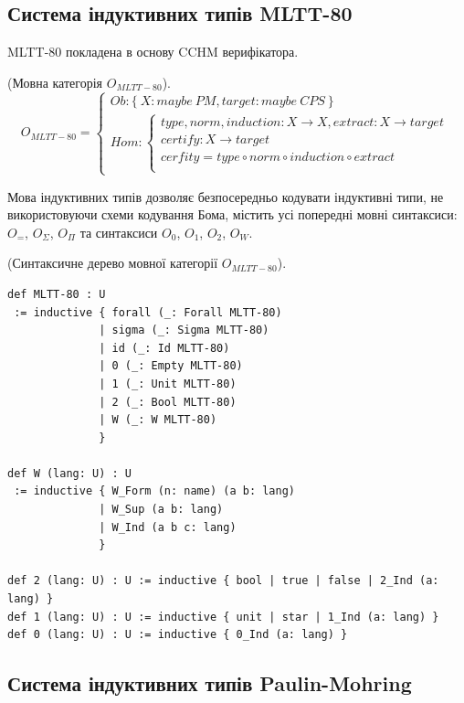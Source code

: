 \subsection{Система індуктивних типів MLTT-80}

MLTT-80 покладена в основу CCHM верифікатора.

\begin{definition} (Мовна категорія $O_{MLTT-80}$).
\begin{equation}
O_{MLTT-80} =
\begin{cases}
Ob: \{\ X: maybe\ PM, target: maybe\ CPS\ \} \\
Hom: \begin{cases}
type,norm,induction: X \rightarrow X, extract: X \rightarrow target \\
certify : X \rightarrow target \\
cerfity = type \circ norm \circ induction \circ extract \\
\end{cases}
\end{cases}
\end{equation}
\end{definition}

Мова індуктивних типів дозволяє безпосередньо кодувати індуктивні типи,
не використовуючи схеми кодування Бома, містить усі попередні мовні синтаксиси:
$O_=$, $O_\Sigma$, $O_\Pi$ та синтаксиси $O_0$, $O_1$, $O_2$, $O_W$.

\begin{definition} (Синтаксичне дерево мовної категорії $O_{MLTT-80}$).
\begin{lstlisting}
def MLTT-80 : U
 := inductive { forall (_: Forall MLTT-80)
              | sigma (_: Sigma MLTT-80)
              | id (_: Id MLTT-80)
              | 0 (_: Empty MLTT-80)
              | 1 (_: Unit MLTT-80)
              | 2 (_: Bool MLTT-80)
              | W (_: W MLTT-80)
              }

def W (lang: U) : U
 := inductive { W_Form (n: name) (a b: lang)
              | W_Sup (a b: lang)
              | W_Ind (a b c: lang)
              }

def 2 (lang: U) : U := inductive { bool | true | false | 2_Ind (a: lang) }
def 1 (lang: U) : U := inductive { unit | star | 1_Ind (a: lang) }
def 0 (lang: U) : U := inductive { 0_Ind (a: lang) }

\end{lstlisting}
\end{definition}

\newpage
\subsection{Система індуктивних типів Paulin-Mohring}

